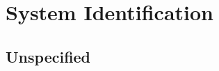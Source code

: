 \part{System Identification}
\label{system_identification}

\chapter{Unspecified}
\label{unspecified}























	